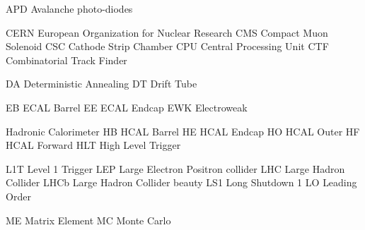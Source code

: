 
  {APD}  {Avalanche photo-diodes}


 {CERN} {European Organization for Nuclear Research} %
  {CMS}  {Compact Muon Solenoid}
  {CSC}  {Cathode Strip Chamber}
  {CPU}  {Central Processing Unit}
  {CTF}  {Combinatorial Track Finder}

 {DA} {Deterministic Annealing}
 {DT} {Drift Tube}

  {EB}  {ECAL Barrel}
  {EE}  {ECAL Endcap}
 {EWK} {Electroweak}



  {Hadronic Calorimeter}
  {HB}    {HCAL Barrel}
  {HE}    {HCAL Endcap}
  {HO}    {HCAL Outer}
  {HF}    {HCAL Forward}
 {HLT}   {High Level Trigger}




   {L1T}   {Level 1 Trigger}
   {LEP}   {Large Electron Positron collider}
   {LHC}   {Large Hadron Collider}
  {LHCb}  {Large Hadron Collider beauty}
   {LS1}   {Long Shutdown 1}
    {LO}    {Leading Order}

 {ME} {Matrix Element}
 {MC} {Monte Carlo}

